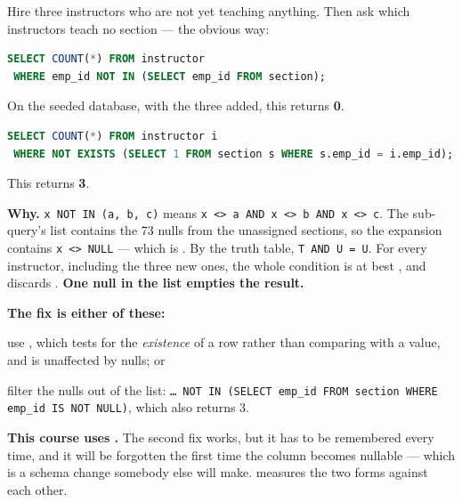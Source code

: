 \begin{alertbox}
Hire three instructors who are not yet teaching anything. Then ask which
instructors teach no section --- the obvious way:

\begin{lstlisting}[language=sql]
SELECT COUNT(*) FROM instructor
 WHERE emp_id NOT IN (SELECT emp_id FROM section);
\end{lstlisting}

On the seeded database, with the three added, this returns \textbf{0}.

\begin{lstlisting}[language=sql]
SELECT COUNT(*) FROM instructor i
 WHERE NOT EXISTS (SELECT 1 FROM section s WHERE s.emp_id = i.emp_id);
\end{lstlisting}

This returns \textbf{3}.

\medskip
\textbf{Why.} \texttt{x NOT IN (a, b, c)} means \texttt{x <> a AND x <> b AND
x <> c}. The sub-query's list contains the 73 nulls from the unassigned
sections, so the expansion contains \texttt{x <> NULL} --- which is
\unk{}. By the truth table, \texttt{T AND U = U}. For every
instructor, including the three new ones, the whole condition is at best
\unk{}, and  discards \unk{}. \textbf{One null
in the list empties the result.}

\medskip
\textbf{The fix is either of these:}
\begin{tight}
  \item use , which tests for the \emph{existence} of a row
        rather than comparing with a value, and is unaffected by nulls; or
  \item filter the nulls out of the list:
        \texttt{\dots\ NOT IN (SELECT emp\_id FROM section WHERE emp\_id IS NOT
        NULL)}, which also returns 3.
\end{tight}

\smallskip
\textbf{This course uses .} The second fix works, but it has
to be remembered every time, and it will be forgotten the first time the
column becomes nullable --- which is a schema change somebody else will make.
 measures the two forms against each other.
\end{alertbox}

